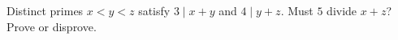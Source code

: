 Distinct primes $x<y<z$ satisfy $3\mid x+y$ and $4\mid y+z$. Must $5$ divide $x+z$? Prove or disprove.
